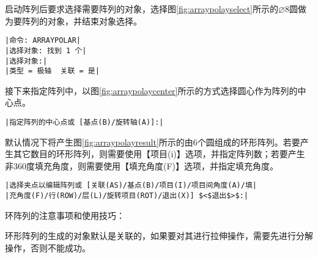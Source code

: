 \begin{procedure}
启动阵列后要求选择需要阵列的对象，选择图\ref{fig:arraypolayselect}所示的$\diameter 8$圆做为要阵列的对象，并结束对象选择。
\begin{lstlisting}
|命令: ARRAYPOLAR|
|选择对象: 找到 1 个|
|选择对象:|
|类型 = 极轴  关联 = 是|
\end{lstlisting}
接下来指定阵列中，以图\ref{fig:arraypolaycenter}所示的方式选择圆心作为阵列的中心点。
\begin{lstlisting}
|指定阵列的中心点或 [基点(B)/旋转轴(A)]:|
\end{lstlisting}
默认情况下将产生图\ref{fig:arraypolayresult}所示的由6个圆组成的环形阵列。若要产生其它数目的环形阵列，则需要使用【项目(i)】选项，并指定阵列数；若要产生非360度填充角度，则需要使用【填充角度(F)】选项，并指定填充角度。
\begin{lstlisting}
|选择夹点以编辑阵列或 [关联(AS)/基点(B)/项目(I)/项目间角度(A)/填|
|充角度(F)/行(ROW)/层(L)/旋转项目(ROT)/退出(X)] $<$退出$>$:|
\end{lstlisting}
\end{procedure}
环阵列的注意事项和使用技巧：
\begin{tips}
\item 环形阵列的生成的对象默认是关联的，如果要对其进行拉伸操作，需要先进行分解操作，否则不能成功。
\end{tips}
\endinput